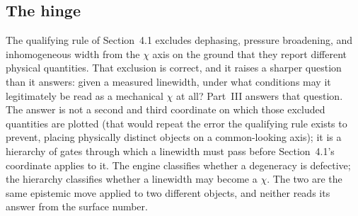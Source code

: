 \subsection{The hinge}

The qualifying rule of Section~4.1 excludes dephasing, pressure broadening, and inhomogeneous width from the $\chi$ axis on the ground that they report different physical quantities. That exclusion is correct, and it raises a sharper question than it answers: given a measured linewidth, under what conditions may it legitimately be read as a mechanical $\chi$ at all? Part~III answers that question. The answer is not a second and third coordinate on which those excluded quantities are plotted (that would repeat the error the qualifying rule exists to prevent, placing physically distinct objects on a common-looking axis); it is a hierarchy of gates through which a linewidth must pass before Section~4.1's coordinate applies to it. The engine classifies whether a degeneracy is defective; the hierarchy classifies whether a linewidth may become a $\chi$. The two are the same epistemic move applied to two different objects, and neither reads its answer from the surface number.
